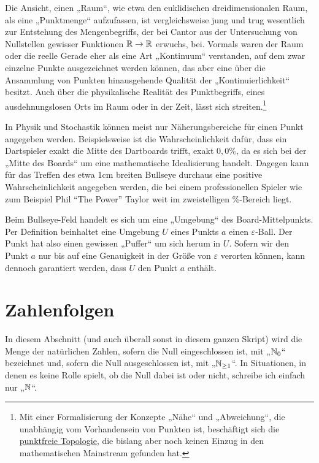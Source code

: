 \begin{bem}[Intuition]
    Die Ansicht, einen „Raum“, wie etwa den euklidischen dreidimensionalen Raum, als eine „Punktmenge“ aufzufassen, ist vergleichsweise jung und trug wesentlich zur Entstehung des Mengenbegriffs, der bei Cantor aus der Untersuchung von Nullstellen gewisser Funktionen $\mathbb R \to \mathbb R$ erwuchs, bei. Vormals waren der Raum oder die reelle Gerade eher als eine Art „Kontinuum“ verstanden, auf dem zwar einzelne Punkte ausgezeichnet werden können, das aber eine über die Ansammlung von Punkten hinausgehende Qualität der „Kontinuierlichkeit“ besitzt. Auch über die physikalische Realität des Punktbegriffs, eines ausdehnungslosen Orts im Raum oder in der Zeit, lässt sich streiten.\footnote{Mit einer Formalisierung der Konzepte „Nähe“ und „Abweichung“, die unabhängig vom Vorhandensein von Punkten ist, beschäftigt sich die \href{https://en.wikipedia.org/wiki/Pointless_topology}{punktfreie Topologie}, die bislang aber noch keinen Einzug in den mathematischen Mainstream gefunden hat.}
    
    In Physik und Stochastik können meist nur Näherungsbereiche für einen Punkt angegeben werden. Beispielsweise ist die Wahrscheinlichkeit dafür, dass ein Dartspieler exakt die Mitte des Dartboards trifft, exakt $0{,}0\%$, da es sich bei der „Mitte des Boards“ um eine mathematische Idealisierung handelt. Dagegen kann für das Treffen des etwa 1cm breiten Bullseye durchaus eine positive Wahrscheinlichkeit angegeben werden, die bei einem professionellen Spieler wie zum Beispiel Phil ``The Power'' Taylor weit im zweistelligen \%-Bereich liegt.
    
    Beim Bullseye-Feld handelt es sich um eine „Umgebung“ des Board-Mittelpunkts. Per Definition beinhaltet eine Umgebung $U$ eines Punkts $a$ einen $\varepsilon$-Ball. Der Punkt hat also einen gewissen „Puffer“ um sich herum in $U$. Sofern wir den Punkt $a$ nur bis auf eine Genauigkeit in der Größe von $\varepsilon$ verorten können, kann dennoch garantiert werden, dass $U$ den Punkt $a$ enthält.
\end{bem}





\section{Zahlenfolgen}


\begin{bem} \label{natzahlen}
    In diesem Abschnitt (und auch überall sonst in diesem ganzen Skript) wird die Menge der natürlichen Zahlen, sofern die Null eingeschlossen ist, mit „$\mathbb N_0$“ bezeichnet und, sofern die Null ausgeschlossen ist, mit „$\mathbb N_{\ge 1}$“. In Situationen, in denen es keine Rolle spielt, ob die Null dabei ist oder nicht, schreibe ich einfach nur „$\mathbb N$“.
\end{bem}


